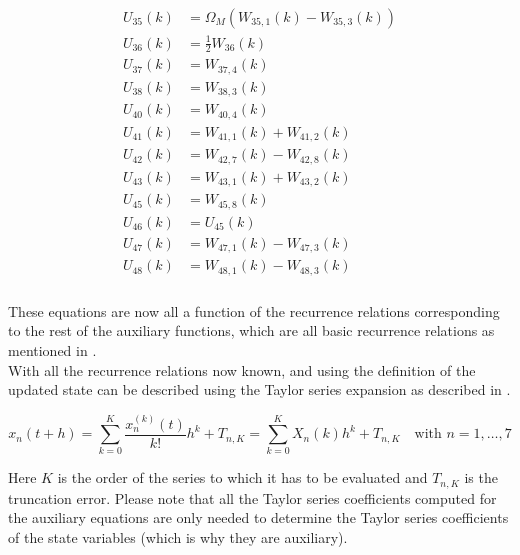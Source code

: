 \begin{align} \label{eq:allRecRel4}
\begin{split}
U_{35} \left(k\right)&= \Omega_{M}\left(W_{35,1}\left(k\right)-W_{35,3}\left(k\right)\right) \\ 
U_{36} \left(k\right)&= \frac{1}{2}W_{36}\left(k\right) \\
U_{37} \left(k\right)&= W_{37,4}\left(k\right) \\
U_{38} \left(k\right)&= W_{38,3}\left(k\right) \\
U_{40} \left(k\right)&= W_{40,4}\left(k\right) \\
U_{41} \left(k\right)&= W_{41,1}\left(k\right)+W_{41,2}\left(k\right) \\
U_{42} \left(k\right)&= W_{42,7}\left(k\right)-W_{42,8}\left(k\right) \\
U_{43} \left(k\right)&= W_{43,1}\left(k\right)+W_{43,2}\left(k\right) \\
U_{45} \left(k\right)&= W_{45,8}\left(k\right) \\
U_{46} \left(k\right)&= U_{45} \left(k\right) \\
U_{47} \left(k\right) &= W_{47,1}\left(k\right)-W_{47,3}\left(k\right) \\
U_{48} \left(k\right) &= W_{48,1}\left(k\right)-W_{48,3}\left(k\right) \\
\end{split}
\end{align}

These equations are now all a function of the recurrence relations corresponding to the rest of the auxiliary functions, which are all basic recurrence relations as mentioned in . \\

With all the recurrence relations now known, and using the definition of  the updated state can be described using the Taylor series expansion as described in .

\begin{equation} \label{eq:TSexp}
x_{n}\left(t+h\right)=\displaystyle\sum_{k=0}^{K}\dfrac{x_{n}^{\left( k\right)}\left(t\right)}{k!}h^{k}+T_{n,K}=\displaystyle\sum_{k=0}^{K}X_{n}\left( k \right) h^{k}+T_{n,K} \quad \text{with }n=1,\dotsc,7
\end{equation}

Here $K$ is the order of the series to which it has to be evaluated and $T_{n,K}$ is the truncation error. Please note that all the Taylor series coefficients computed for the auxiliary equations are only needed to determine the Taylor series coefficients of the state variables (which is why they are auxiliary).

